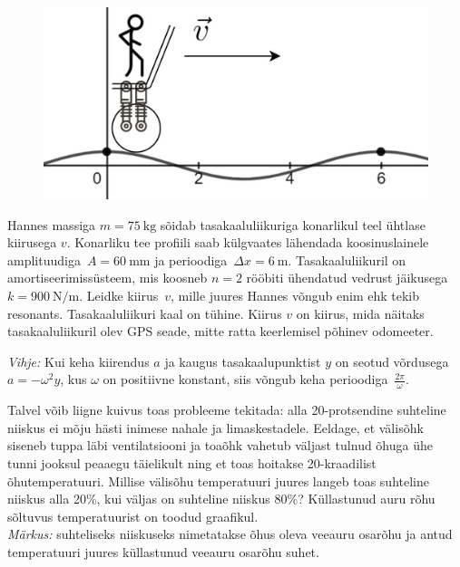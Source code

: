 \documentclass[10pt]{article}
\begin{document}
\begin{figure}
  \vspace{-5pt}
  \begin{center}
  \includegraphics[scale=0.1]{2020-v3g-04-yl.png}
  \end{center}
  \vspace{-25pt}
\end{figure}
Hannes massiga $m = \SI{75}{\kilo\gram}$ sõidab tasakaaluliikuriga  konarlikul
teel ühtlase kiirusega $v$. Konarliku tee profiili saab külgvaates lähendada
koosinuslainele amplituudiga~$A = \SI{60}{\milli\meter}$ ja
perioodiga~$\Delta x = \SI{6}{\meter}$. Tasakaaluliikuril on amortiseerimissüsteem,
mis koosneb $n=2$ rööbiti ühendatud vedrust jäikusega $k = \SI{900}{\newton\per\meter}$.
Leidke kiirus~$v$, mille juures Hannes võngub enim ehk tekib resonants.
Tasakaaluliikuri kaal on tühine. Kiirus $v$ on kiirus, mida näitaks
tasakaaluliikuril olev GPS seade, mitte ratta keerlemisel põhinev odomeeter.

\emph{Vihje:} Kui keha kiirendus $a$ ja kaugus tasakaalupunktist $y$ on seotud
võrdusega $a=-\omega^2 y$, kus $\omega$ on positiivne konstant, siis võngub keha
perioodiga~$\frac{2\pi}{\omega}$.
\probend
\bigskip


Talvel võib liigne kuivus toas probleeme tekitada: alla 20-protsendine suhteline niiskus ei mõju hästi inimese nahale ja limaskestadele. Eeldage, et välisõhk siseneb tuppa läbi ventilatsiooni ja toaõhk vahetub väljast tulnud õhuga ühe tunni jooksul peaaegu täielikult ning et toas hoitakse 20-kraadilist õhutemperatuuri. Millise välisõhu temperatuuri juures langeb toas suhteline niiskus alla 20\%, kui väljas on suhteline niiskus 80\%? Küllastunud auru rõhu sõltuvus temperatuurist on toodud graafikul.\\
\emph{Märkus:} suhteliseks niiskuseks nimetatakse õhus oleva veeauru osarõhu ja antud temperatuuri juures küllastunud veeauru osarõhu suhet.
\end{document}
